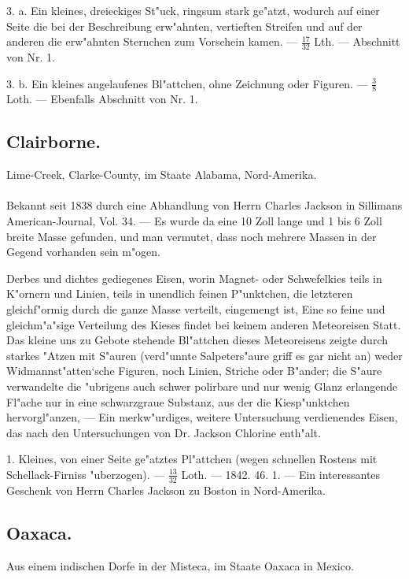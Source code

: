 \documentclass[a4paper, 11pt, oneside, polutonikogreek, german]{article}
\begin{document}
3. a. Ein kleines, dreieckiges St"uck, ringsum stark ge"atzt, wodurch auf einer Seite die bei der Beschreibung erw"ahnten, vertieften Streifen und auf der anderen die erw"ahnten Sternchen zum Vorschein kamen. --- $\frac{17}{32}$ Lth. --- Abschnitt von Nr. 1.

3. b. Ein kleines angelaufenes Bl"attchen, ohne Zeichnung oder Figuren. --- $\frac{3}{8}$ Loth. --- Ebenfalls Abschnitt von Nr. 1.
\subsection{Clairborne.}
\begin{center}
\small
Lime-Creek, Clarke-County, im Staate Alabama, Nord-Amerika.
\end{center}
\paragraph{}
Bekannt seit 1838 durch eine Abhandlung von Herrn Charles Jackson in Sillimans American-Journal, Vol. 34. --- Es wurde da eine 10 Zoll lange und 1 bis 6 Zoll breite Masse gefunden, und man vermutet, dass noch mehrere Massen in der Gegend vorhanden sein m"ogen.

Derbes und dichtes gediegenes Eisen, worin Magnet- oder Schwefelkies teils in K"ornern und Linien, teils in unendlich feinen P"unktchen, die letzteren gleichf"ormig durch die ganze Masse verteilt, eingemengt ist, Eine so feine und gleichm"a"sige Verteilung des Kieses findet bei keinem anderen Meteoreisen Statt. Das kleine uns zu Gebote stehende Bl"attchen dieses Meteoreisens zeigte durch starkes "Atzen mit S"auren (verd"unnte Salpeters"aure griff es gar nicht an) weder Widmannst"atten‘sche Figuren, noch Linien, Striche oder B"ander; die S"aure verwandelte die "ubrigens auch schwer polirbare und nur wenig Glanz erlangende Fl"ache nur in eine schwarzgraue Substanz, aus der die Kiesp"unktchen hervorgl"anzen, --- Ein merkw"urdiges, weitere Untersuchung verdienendes Eisen, das nach den Untersuchungen von Dr. Jackson Chlorine enth"alt.

1. Kleines, von einer Seite ge"atztes Pl"attchen (wegen schnellen Rostens mit Schellack-Firniss "uberzogen). --- $\frac{13}{32}$ Loth. --- 1842. 46. 1. --- Ein interessantes Geschenk von Herrn Charles Jackson zu Boston in Nord-Amerika.
\subsection{Oaxaca.}
\begin{center}
\small
Aus einem indischen Dorfe in der Misteca, im Staate Oaxaca in Mexico.
\end{center}
\end{document}
